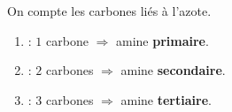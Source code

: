 \documentclass[11pt,a4paper]{article}
\begin{document}
\begin{corrige}
On compte les carbones liés à l'azote.
\begin{enumerate}[label=\alph*)]
  \item {} : $1$ carbone $\Rightarrow$ amine \textbf{primaire}.
  \item {} : $2$ carbones $\Rightarrow$ amine \textbf{secondaire}.
  \item {} : $3$ carbones $\Rightarrow$ amine \textbf{tertiaire}.
\end{enumerate}
\end{corrige}
\end{document}

